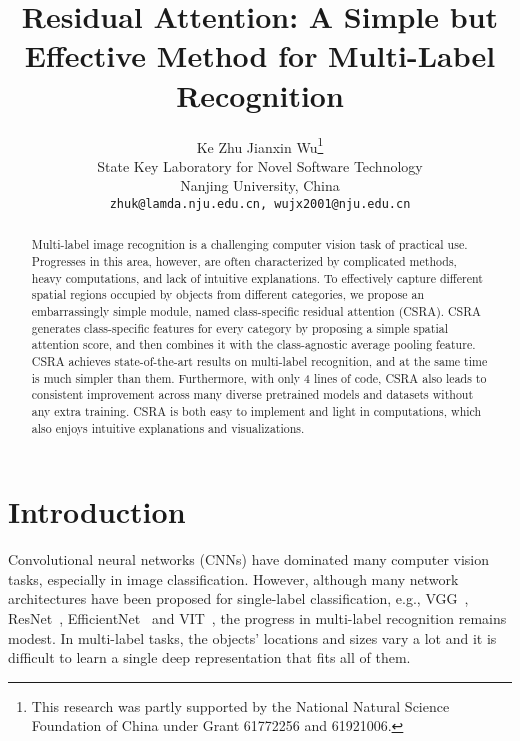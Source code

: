 \documentclass[10pt,twocolumn,letterpaper]{article}
\begin{document}
\title{Residual Attention: A Simple but Effective Method for Multi-Label Recognition}

\author{Ke Zhu \quad Jianxin Wu\thanks{This research was partly supported by the National Natural Science Foundation of China under Grant 61772256 and 61921006.}\\
State Key Laboratory for Novel Software Technology\\
Nanjing University, China \\
{\tt\small zhuk@lamda.nju.edu.cn, wujx2001@nju.edu.cn}
}

\maketitle
\ificcvfinal\thispagestyle{empty}\fi

\begin{abstract}
	Multi-label image recognition is a challenging computer vision task of practical use. Progresses in this area, however, are often characterized by complicated methods, heavy computations, and lack of intuitive explanations. To effectively capture different spatial regions occupied by objects from different categories, we propose an embarrassingly simple module, named class-specific residual attention (CSRA). CSRA generates class-specific features for every category by proposing a simple spatial attention score, and then combines it with the class-agnostic average pooling feature. CSRA achieves state-of-the-art results on multi-label recognition, and at the same time is much simpler than them. Furthermore, with only 4 lines of code, CSRA also leads to consistent improvement across many diverse pretrained models and datasets without any extra training. CSRA is both easy to implement and light in computations, which also enjoys intuitive explanations and visualizations.
\end{abstract}

\section{Introduction}

Convolutional neural networks (CNNs) have dominated many computer vision tasks, especially in image classification. However, although many network architectures have been proposed for single-label classification, e.g., VGG~\cite{VGG}, ResNet~\cite{ResNet}, EfficientNet~\cite{Efficientnet} and VIT~\cite{VIT}, the progress in multi-label recognition remains modest. In multi-label tasks, the objects' locations and sizes vary a lot and it is difficult to learn a single deep representation that fits all of them.
\end{document}
